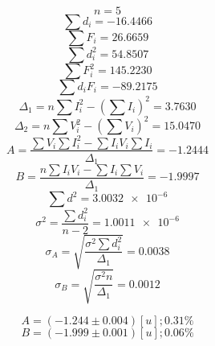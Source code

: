\documentclass[letter,11pt]{article}
\begin{document}
\begin{enumerate}
    \begin{equation*}
        n = 5
    \end{equation*}
    \begin{equation*}
        \sum d_i = -16.4466
    \end{equation*}
    \begin{equation*}
        \sum F_i = 26.6659
    \end{equation*}
    \begin{equation*}
        \sum d^2_i = 54.8507
    \end{equation*}
    \begin{equation*}
        \sum F^2_i = 145.2230
    \end{equation*}
    \begin{equation*}
        \sum d_i F_i = -89.2175
    \end{equation*}
    \begin{equation*}
        \Delta_1 = n \sum I^2_i - \left( \sum I_i \right)^2 = 3.7630
    \end{equation*}
    \begin{equation*}
        \Delta_2 = n \sum V^2_i - \left( \sum V_i \right)^2 = 15.0470
    \end{equation*}
    \begin{equation*}
        A = \frac{\sum V_i \sum I^2_i - \sum I_i V_i \sum I_i}{\Delta_1} = -1.2444
    \end{equation*}
    \begin{equation*}
        B = \frac{n \sum I_i V_i - \sum I_i \sum V_i}{\Delta_1} = -1.9997
    \end{equation*}
    \begin{equation*}
        \sum d^2 = \num{3.0032e-6}
    \end{equation*}
    \begin{equation*}
        \sigma^2 = \frac{\sum d^2_i}{n-2} = \num{1.0011e-6}
    \end{equation*}
    \begin{equation*}
        \sigma_A = \sqrt{\frac{\sigma^2 \sum d^2_i}{\Delta_1}} = 0.0038
    \end{equation*}
    \begin{equation*}
        \sigma_B = \sqrt{\frac{\sigma^2 n}{\Delta_1}} = 0.0012
    \end{equation*}

    \begin{equation*}
        A = (-1.244 \pm 0.004)[u]; 0.31 \%
    \end{equation*}
    \begin{equation*}
        B = (-1.999 \pm 0.001)[u]; 0.06 \%
    \end{equation*}


\end{enumerate}
\end{document}
